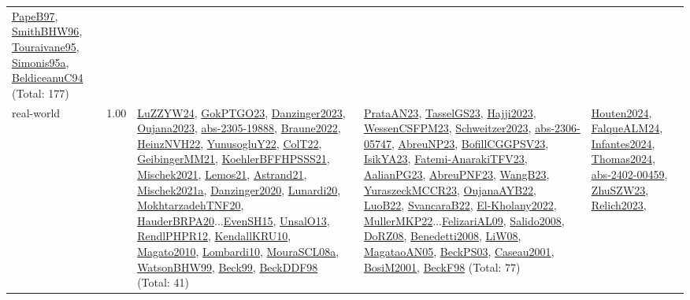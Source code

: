 {\begin{longtable}{p{3cm}r>{\raggedright\arraybackslash}p{6cm}>{\raggedright\arraybackslash}p{6cm}>{\raggedright\arraybackslash}p{8cm}}
\hyperref[detail:PapeB97]{PapeB97}, \hyperref[detail:SmithBHW96]{SmithBHW96}, \hyperref[detail:Touraivane95]{Touraivane95}, \hyperref[detail:Simonis95a]{Simonis95a}, \hyperref[detail:BeldiceanuC94]{BeldiceanuC94} (Total: 177)\\
\index{real-world}\index{Benchmarks!real-world}real-world &  1.00 & \hyperref[detail:LuZZYW24]{LuZZYW24}, \hyperref[detail:GokPTGO23]{GokPTGO23}, \hyperref[detail:Danzinger2023]{Danzinger2023}, \hyperref[detail:Oujana2023]{Oujana2023}, \hyperref[detail:abs-2305-19888]{abs-2305-19888}, \hyperref[detail:Braune2022]{Braune2022}, \hyperref[detail:HeinzNVH22]{HeinzNVH22}, \hyperref[detail:YunusogluY22]{YunusogluY22}, \hyperref[detail:ColT22]{ColT22}, \hyperref[detail:GeibingerMM21]{GeibingerMM21}, \hyperref[detail:KoehlerBFFHPSSS21]{KoehlerBFFHPSSS21}, \hyperref[detail:Mischek2021]{Mischek2021}, \hyperref[detail:Lemos21]{Lemos21}, \hyperref[detail:Astrand21]{Astrand21}, \hyperref[detail:Mischek2021a]{Mischek2021a}, \hyperref[detail:Danzinger2020]{Danzinger2020}, \hyperref[detail:Lunardi20]{Lunardi20}, \hyperref[detail:MokhtarzadehTNF20]{MokhtarzadehTNF20}, \hyperref[detail:HauderBRPA20]{HauderBRPA20}...\hyperref[detail:EvenSH15]{EvenSH15}, \hyperref[detail:UnsalO13]{UnsalO13}, \hyperref[detail:RendlPHPR12]{RendlPHPR12}, \hyperref[detail:KendallKRU10]{KendallKRU10}, \hyperref[detail:Magato2010]{Magato2010}, \hyperref[detail:Lombardi10]{Lombardi10}, \hyperref[detail:MouraSCL08a]{MouraSCL08a}, \hyperref[detail:WatsonBHW99]{WatsonBHW99}, \hyperref[detail:Beck99]{Beck99}, \hyperref[detail:BeckDDF98]{BeckDDF98} (Total: 41) & \hyperref[detail:PrataAN23]{PrataAN23}, \hyperref[detail:TasselGS23]{TasselGS23}, \hyperref[detail:Hajji2023]{Hajji2023}, \hyperref[detail:WessenCSFPM23]{WessenCSFPM23}, \hyperref[detail:Schweitzer2023]{Schweitzer2023}, \hyperref[detail:abs-2306-05747]{abs-2306-05747}, \hyperref[detail:AbreuNP23]{AbreuNP23}, \hyperref[detail:BofillCGGPSV23]{BofillCGGPSV23}, \hyperref[detail:IsikYA23]{IsikYA23}, \hyperref[detail:Fatemi-AnarakiTFV23]{Fatemi-AnarakiTFV23}, \hyperref[detail:AalianPG23]{AalianPG23}, \hyperref[detail:AbreuPNF23]{AbreuPNF23}, \hyperref[detail:WangB23]{WangB23}, \hyperref[detail:YuraszeckMCCR23]{YuraszeckMCCR23}, \hyperref[detail:OujanaAYB22]{OujanaAYB22}, \hyperref[detail:LuoB22]{LuoB22}, \hyperref[detail:SvancaraB22]{SvancaraB22}, \hyperref[detail:El-Kholany2022]{El-Kholany2022}, \hyperref[detail:MullerMKP22]{MullerMKP22}...\hyperref[detail:FelizariAL09]{FelizariAL09}, \hyperref[detail:Salido2008]{Salido2008}, \hyperref[detail:DoRZ08]{DoRZ08}, \hyperref[detail:Benedetti2008]{Benedetti2008}, \hyperref[detail:LiW08]{LiW08}, \hyperref[detail:MagataoAN05]{MagataoAN05}, \hyperref[detail:BeckPS03]{BeckPS03}, \hyperref[detail:Caseau2001]{Caseau2001}, \hyperref[detail:BosiM2001]{BosiM2001}, \hyperref[detail:BeckF98]{BeckF98} (Total: 77) & \hyperref[detail:Houten2024]{Houten2024}, \hyperref[detail:FalqueALM24]{FalqueALM24}, \hyperref[detail:Infantes2024]{Infantes2024}, \hyperref[detail:Thomas2024]{Thomas2024}, \hyperref[detail:abs-2402-00459]{abs-2402-00459}, \hyperref[detail:ZhuSZW23]{ZhuSZW23}, \hyperref[detail:Relich2023]{Relich2023}, 
\end{longtable}}
